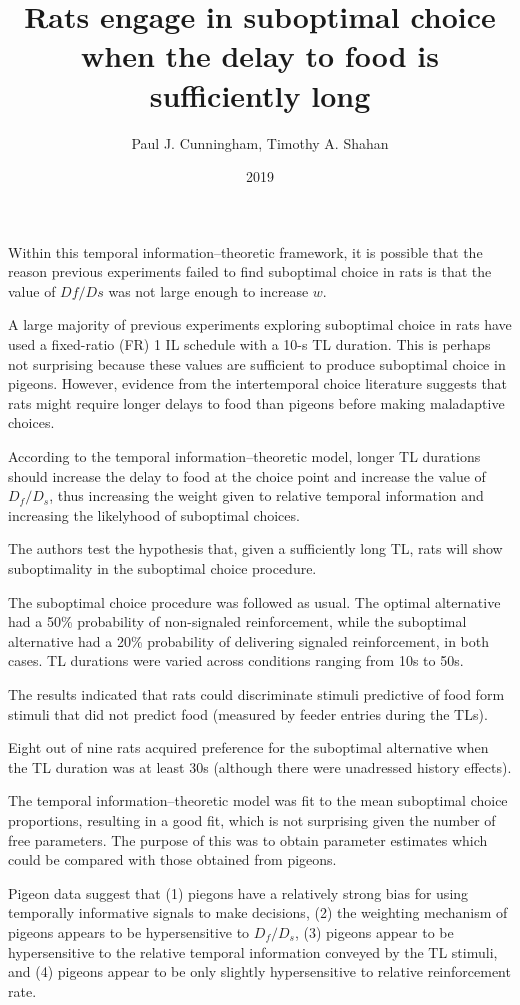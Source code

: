 \documentclass[a4paper,12pt]{article}
\title{Rats engage in suboptimal choice when the delay to food is sufficiently long}
\author{Paul J. Cunningham, Timothy A. Shahan}
\date{2019}
\begin{document}
{\scshape\bfseries \maketitle}

Within this temporal information–theoretic framework, it is possible that the reason previous experiments failed to find suboptimal choice in rats is that the value of $Df/Ds$ was not large enough to increase $w$.

A large majority of previous experiments exploring suboptimal choice in rats have used a fixed-ratio (FR) 1 IL schedule with a 10-s TL duration. This is perhaps not surprising because these values are sufficient to produce suboptimal choice in pigeons. However, evidence from the intertemporal choice literature suggests that rats might require longer delays to food than pigeons before making maladaptive choices.

According to the temporal information–theoretic model, longer TL durations should increase the delay to food at the choice point and increase the value of $D_f/D_s$, thus increasing the weight given to relative temporal information and increasing the likelyhood of suboptimal choices.

The authors test the hypothesis that, given a sufficiently long TL, rats will show suboptimality in the suboptimal choice procedure.

The suboptimal choice procedure was followed as usual. The optimal alternative had a 50\% probability of non-signaled reinforcement, while the suboptimal alternative had a 20\% probability of delivering signaled reinforcement, in both cases. TL durations were varied across conditions ranging from 10s to 50s.

The results indicated that rats could discriminate stimuli predictive of food form stimuli that did not predict food (measured by feeder entries during the TLs).

Eight out of nine rats acquired preference for the suboptimal alternative when the TL duration was at least 30s (although there were unadressed history effects).

The temporal information–theoretic model was fit to the mean suboptimal choice proportions, resulting in a good fit, which is not surprising given the number of free parameters. The purpose of this was to obtain parameter estimates which could be compared with those obtained from pigeons.

Pigeon data suggest that (1) piegons have a relatively strong bias for using temporally informative signals to make decisions, (2) the weighting mechanism of pigeons appears to be hypersensitive to $D_f/D_s$, (3) pigeons appear to be hypersensitive to the relative temporal information conveyed by the TL stimuli, and (4) pigeons appear to be only slightly hypersensitive to relative reinforcement rate.
\end{document}
